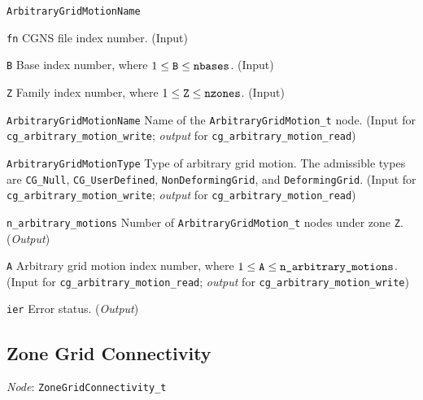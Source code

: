 \begin{Ventryi}{\texttt{ArbitraryGridMotionName}}\raggedright
\item [\texttt{fn}]
      CGNS file index number.
      (\textcolor{input}{Input})
\item [\texttt{B}]
      Base index number, where $1 \leq \text{\texttt{B}} \leq \text{\texttt{nbases}}$.
      (\textcolor{input}{Input})
\item [\texttt{Z}]
      Family index number, where $1 \leq \text{\texttt{Z}} \leq \text{\texttt{nzones}}$.
      (\textcolor{input}{Input})
\item [\texttt{ArbitraryGridMotionName}]
      Name of the \texttt{ArbitraryGridMotion\_t} node.
      (\textcolor{input}{Input} for \texttt{cg\_arbitrary\_motion\_write};
      \textcolor{output}{\textit{output}} for \texttt{cg\_arbitrary\_motion\_read})
\item [\texttt{ArbitraryGridMotionType}]
      Type of arbitrary grid motion.
      The admissible types are \texttt{CG\_Null}, \texttt{CG\_UserDefined},
      \texttt{NonDeformingGrid}, and \texttt{DeformingGrid}.
      (\textcolor{input}{Input} for \texttt{cg\_arbitrary\_motion\_write};
      \textcolor{output}{\textit{output}} for \texttt{cg\_arbitrary\_motion\_read})
\item [\texttt{n\_arbitrary\_motions}]
      Number of \texttt{ArbitraryGridMotion\_t} nodes under zone \texttt{Z}.
      (\textcolor{output}{\textit{Output}})
\item [\texttt{A}]
      Arbitrary grid motion index number, where $1 \leq \text{\texttt{A}} \leq \text{\texttt{n\_arbitrary\_motions}}$.
      (\textcolor{input}{Input} for \texttt{cg\_arbitrary\_motion\_read};
      \textcolor{output}{\textit{output}} for \texttt{cg\_arbitrary\_motion\_write})
\item [\texttt{ier}]
      Error status.
      (\textcolor{output}{\textit{Output}})
\end{Ventryi}

\newpage
\subsection{Zone Grid Connectivity}
\label{s:zconn}

\noindent
\textit{Node}: \texttt{ZoneGridConnectivity\_t}

